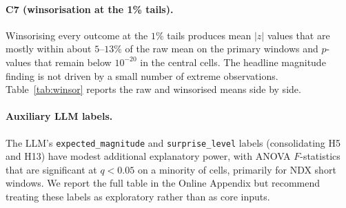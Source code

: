 

\paragraph{C7 (winsorisation at the 1\% tails).}
Winsorising every outcome at the $1\%$ tails produces mean $|z|$
values that are mostly within about $5$--$13\%$ of the raw mean on
the primary windows and $p$-values that remain below $10^{-20}$ in
the central cells. The headline
magnitude finding is not driven by a small number of extreme
observations. Table~\ref{tab:winsor} reports the raw and
winsorised means side by side.



\paragraph{Auxiliary LLM labels.}
The LLM's \texttt{expected\_magnitude} and \texttt{surprise\_level}
labels (consolidating H5 and H13) have modest additional
explanatory power, with ANOVA $F$-statistics that are significant
at $q < 0.05$ on a minority of cells, primarily for NDX short
windows. We report the full table in the Online Appendix but
recommend treating these labels as exploratory rather than as core
inputs.
